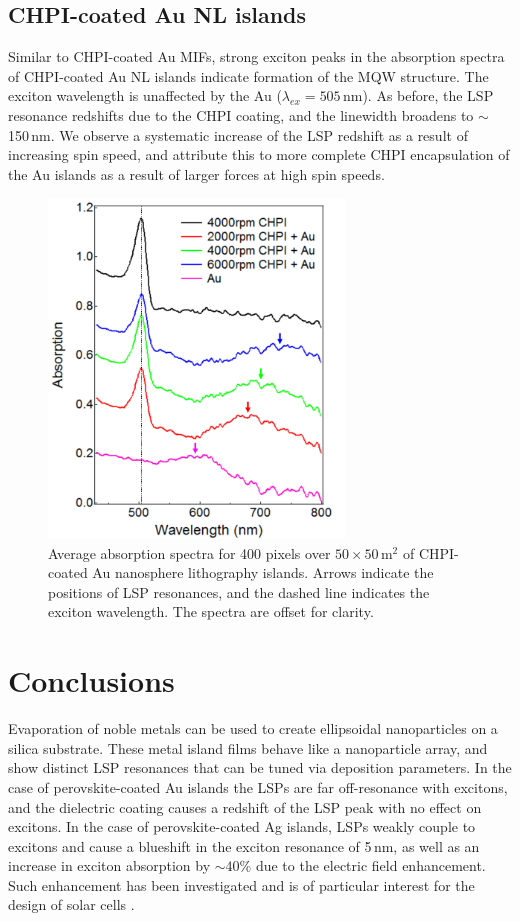\subsection{CHPI-coated Au NL islands}
Similar to CHPI-coated Au MIFs, strong exciton peaks in the absorption spectra of CHPI-coated Au NL islands indicate formation of the MQW structure. The exciton wavelength is unaffected by the Au ($\lambda_{ex} = 505$\,nm). As before, the LSP resonance redshifts due to the CHPI coating, and the linewidth broadens to $\sim$150\,nm. We observe a systematic increase of the LSP redshift as a result of increasing spin speed, and attribute this to more complete CHPI encapsulation of the Au islands as a result of larger forces at high spin speeds.
\begin{figure}[h!] 
\centering    
\includegraphics[width=0.7\textwidth]{Fig10}
\caption{Average absorption spectra for 400 pixels over $50\times50\,$\textmu m$^2$ of CHPI-coated Au nanosphere lithography islands. Arrows indicate the positions of LSP resonances, and the dashed line indicates the exciton wavelength. The spectra are offset for clarity.}
\label{6Fig10}
\end{figure}

\section{Conclusions}
Evaporation of noble metals can be %
used %
to create ellipsoidal nanoparticles on a silica substrate. These metal island films behave like a nanoparticle array, and show distinct LSP resonances that can be tuned via deposition parameters. In the case of perovskite-coated Au islands the LSPs are far off-resonance with excitons, and the dielectric coating causes a redshift of the LSP peak with no effect on excitons. In the case of perovskite-coated Ag islands, LSPs weakly couple to excitons and cause a blueshift in the exciton resonance of 5\,nm, as well as an increase in exciton absorption by $\sim40$\% due to the electric field enhancement. Such enhancement has been investigated and is of particular interest for the design of solar cells \cite{Alemu2014, Zheng2011, Xu2013, Spinelli2012}.

